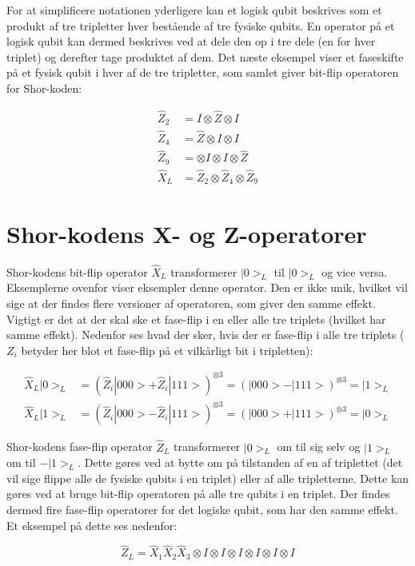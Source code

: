 \documentclass[a4paper,oneside,article]{memoir}
\begin{document}
For at simplificere notationen yderligere kan et logisk qubit beskrives som et produkt af tre tripletter hver bestående af tre fysiske qubits. En operator på et logisk qubit kan dermed beskrives ved at dele den op i tre dele (en for hver triplet) og derefter tage produktet af dem. Det næste eksempel viser et faseskifte på et fysisk qubit i hver af de tre tripletter, som samlet giver bit-flip operatoren for Shor-koden:

\begin{align*}
    \hat{Z}_2 &= I \otimes \hat{Z} \otimes I\\
    \hat{Z}_4 &= \hat{Z} \otimes I \otimes I\\
    \hat{Z}_9 &= \otimes I \otimes I \otimes \hat{Z}\\
    \hat{X}_L &= \hat{Z}_2 \otimes \hat{Z}_4 \otimes \hat{Z}_9
\end{align*}

\section{Shor-kodens X- og Z-operatorer}
Shor-kodens bit-flip operator $\hat{X}_L$ transformerer $|0>_L$ til $|0>_L$ og vice versa. Eksemplerne ovenfor viser eksempler denne operator. Den er ikke unik, hvilket vil sige at der findes flere versioner af operatoren, som giver den samme effekt. Vigtigt er det at der skal ske et fase-flip i en eller alle tre triplets (hvilket har samme effekt). Nedenfor ses hvad der sker, hvis der er fase-flip i alle tre triplets ($Z_i$ betyder her blot et fase-flip på et vilkårligt bit i tripletten):

\begin{align*}
    \hat{X}_L|0>_L &= (\hat{Z}_i|000> + \hat{Z}_i|111>)^{\otimes 3} = (|000> - |111>)^{\otimes 3} = |1>_L\\
    \hat{X}_L|1>_L &= (\hat{Z}_i|000> - \hat{Z}_i|111>)^{\otimes 3} = (|000> + |111>)^{\otimes 3} = |0>_L
\end{align*}

Shor-kodens fase-flip operator $\hat{Z}_L$ transformerer $|0>_L$ om til sig selv og $|1>_L$ om til $-|1>_L$. Dette gøres ved at bytte om på tilstanden af en af triplettet (det vil sige flippe alle de fysiske qubits i en triplet) eller af alle tripletterne. Dette kan gøres ved at bruge bit-flip operatoren på alle tre qubits i en triplet. Der findes dermed fire fase-flip operatorer for det logiske qubit, som har den samme effekt. Et eksempel på dette ses nedenfor:

\begin{equation}
    \hat{Z}_L = \hat{X}_1 \hat{X}_2  \hat{X}_3 \otimes I \otimes I \otimes I \otimes I \otimes I \otimes I
\end{equation}
\end{document}
